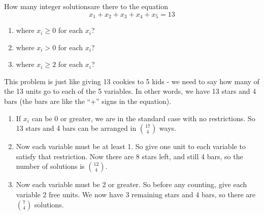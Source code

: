 \documentclass[12pt]{article}
\begin{document}
\begin{example}
  How many integer solutions\footnotemark are there to the equation
  \[x_1 + x_2 + x_3 + x_4 + x_5 = 13\]
  \begin{enumerate}
    \item where $x_i \ge 0$ for each $x_i$?
    \item where $x_i > 0$ for each $x_i$?
    \item where $x_i \ge 2$ for each $x_i$?

  \end{enumerate}
  \begin{solution}
  This problem is just like giving 13 cookies to 5 kids - we need to say how many of the 13 units go to each of the 5 variables.  In other words, we have 13 stars and 4 bars (the bars are like the ``+'' signs in the equation).
      \begin{enumerate}
    \item If $x_i$ can be 0 or greater, we are in the standard case with no restrictions.  So 13 stars and 4 bars can be arranged in ${17 \choose 4}$ ways.
    \item Now each variable must be at least 1.  So give one unit to each variable to satisfy that restriction.  Now there are 8 stars left, and still 4 bars, so the number of solutions is ${12 \choose 4}$.
    \item Now each variable must be 2 or greater.  So before any counting, give each variable 2 free units.  We now have 3 remaining stars and 4 bars, so there are ${7 \choose 4}$ solutions.
      
  \end{enumerate}
  \end{solution}

\end{example}
\end{document}
